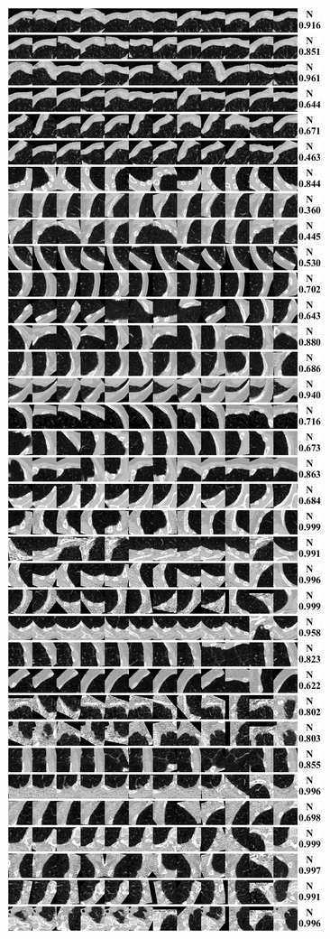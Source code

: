 \documentclass[onecolumn]{IEEEtran}
\begin{document}
\begin{figure}[H]
{\includegraphics[width=0.45\columnwidth]{./images/elcap-nodules-nonnodule1}
}
\end{figure}
\newpage
\end{document}
